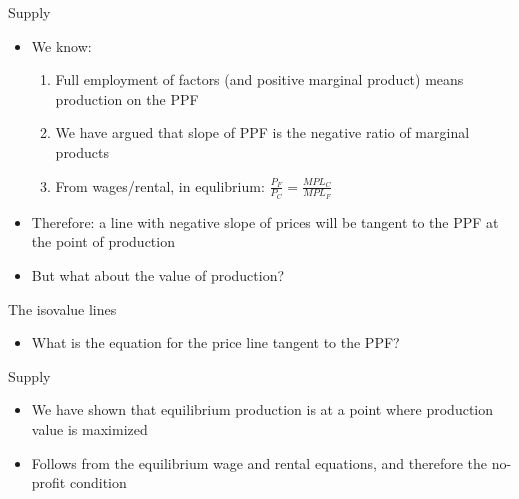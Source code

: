 \documentclass[ignorenonframetext,]{beamer}
\begin{document}
\begin{frame}{Supply}

    \begin{itemize}
        \item We know: 
        \begin{enumerate}
            \item Full employment of factors (and positive marginal product) means production on the PPF 
            \item We have argued that slope of PPF is the negative ratio of marginal products
            \item From wages/rental, in equlibrium: $\frac{P_F}{P_C} = \frac{MPL_C}{MPL_F}$
        \end{enumerate}
        \item Therefore: a line with negative slope of prices will be tangent to the PPF at the point of production
        \item But what about the value of production?
    \end{itemize}

\end{frame}

\begin{frame}{The isovalue lines}

    \begin{itemize}
        \item What is the equation for the price line tangent to the PPF?
    \end{itemize}

\end{frame}

\begin{frame}{Supply}

    \begin{itemize}
        \item We have shown that equilibrium production is at a point where production value is maximized
        \item Follows from the equilibrium wage and rental equations, and therefore the no-profit condition
    \end{itemize}

\end{frame}
\end{document}
